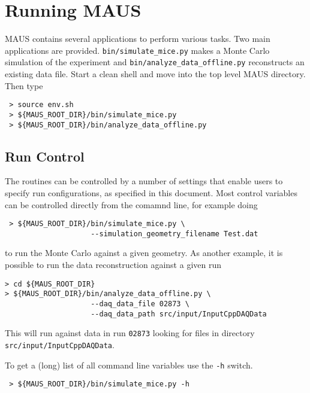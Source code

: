 \section{Running MAUS}
MAUS contains several applications to perform various tasks. Two main applications are provided. \verb|bin/simulate_mice.py| makes a Monte Carlo simulation of the experiment and \verb|bin/analyze_data_offline.py| reconstructs an existing data file. Start a clean shell and move into the top level MAUS directory. Then type
\begin{verbatim}
 > source env.sh
 > ${MAUS_ROOT_DIR}/bin/simulate_mice.py
 > ${MAUS_ROOT_DIR}/bin/analyze_data_offline.py
\end{verbatim}

\subsection{Run Control}
The routines can be controlled by a number of settings that enable users to specify run configurations, as specified in this document. Most control variables can be controlled directly from the comamnd line, for example doing
\begin{verbatim}
 > ${MAUS_ROOT_DIR}/bin/simulate_mice.py \
                    --simulation_geometry_filename Test.dat
\end{verbatim}
to run the Monte Carlo against a given geometry. As another example, it is possible to run the data reconstruction against a given run
\begin{verbatim}
> cd ${MAUS_ROOT_DIR} 
> ${MAUS_ROOT_DIR}/bin/analyze_data_offline.py \
                    --daq_data_file 02873 \
                    --daq_data_path src/input/InputCppDAQData
\end{verbatim}
This will run against data in run \verb|02873| looking for files in directory \verb|src/input/InputCppDAQData|.

To get a (long) list of all command line variables use the \verb|-h| switch.
\begin{verbatim}
 > ${MAUS_ROOT_DIR}/bin/simulate_mice.py -h
\end{verbatim}

